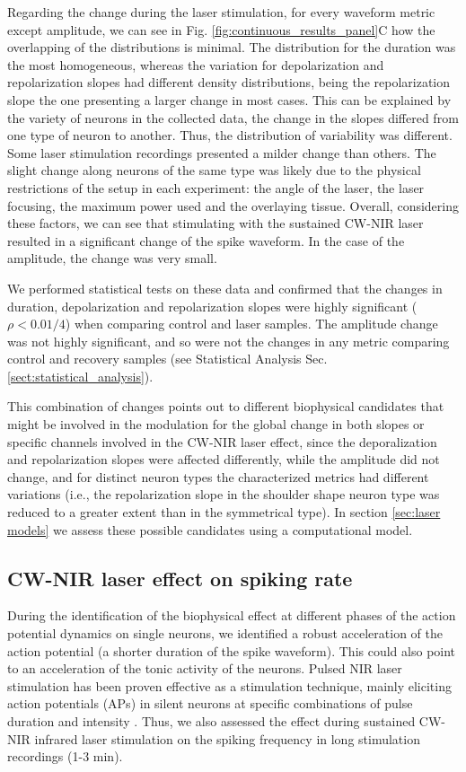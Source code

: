 Regarding the change during the laser stimulation, for every waveform metric except amplitude, we can see in Fig. \ref{fig:continuous_results_panel}C how the overlapping of the distributions is minimal. The distribution for the duration was the most homogeneous, whereas the variation for depolarization and repolarization slopes had different density distributions, being the repolarization slope the one presenting a larger change in most cases. This can be explained by the variety of neurons in the collected data, the change in the slopes differed from one type of neuron to another. Thus, the distribution of variability was different. Some laser stimulation recordings presented a milder change than others. The slight change along neurons of the same type was likely due to the physical restrictions of the setup in each experiment: the angle of the laser, the laser focusing, the maximum power used and the overlaying tissue. Overall, considering these factors, we can see that stimulating with the sustained CW-NIR laser resulted in a significant change of the spike waveform. In the case of the amplitude, the change was very small. 

We performed statistical tests on these data and confirmed that the changes in duration, depolarization and repolarization slopes were highly significant ($\rho < 0.01 /4$) when comparing control and laser samples. The amplitude change was not highly significant, and so were not the changes in any metric comparing control and recovery samples (see Statistical Analysis Sec. \ref{sect:statistical_analysis}).

This combination of changes points out to different biophysical candidates that might be involved in the modulation for the global change in both slopes or specific channels involved in the CW-NIR laser effect, since the deporalization and repolarization slopes were affected differently, while the amplitude did not change, and for distinct neuron types the characterized metrics had different variations (i.e., the repolarization slope in the shoulder shape neuron type was reduced to a greater extent than in the symmetrical type). In section \ref{sec:laser models} we assess these possible candidates using a computational model. 

\subsection{CW-NIR laser effect on spiking rate}
During the identification of the biophysical effect at different phases of the action potential dynamics on single neurons, we identified a robust acceleration of the action potential (a shorter duration of the spike waveform). This could also point to an acceleration of the tonic activity of the neurons. Pulsed NIR laser stimulation has been proven effective as a stimulation technique, mainly eliciting action potentials (APs) in silent neurons at specific combinations of pulse duration and intensity \parencite{wells_application_2005, shapiro_infrared_2012, izzo_optical_2007, cayce_infrared_2014}. Thus, we also assessed the effect during sustained CW-NIR infrared laser stimulation on the spiking frequency in long stimulation recordings (1-3 min). 

